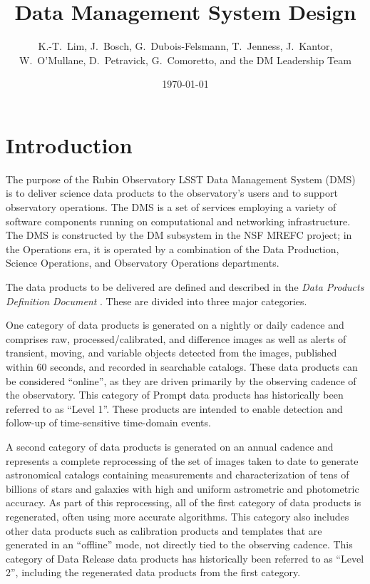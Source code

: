 \documentclass[DM,toc,lsstdraft]{lsstdoc}
\title{Data Management System Design}
\author{
  K.-T.~Lim,
  J.~Bosch,
  G.~Dubois-Felsmann,
  T.~Jenness,
  J.~Kantor,
  W.~O'Mullane,
  D.~Petravick,
  G.~Comoretto,
  and
  the DM Leadership Team}
\date{\today}
\begin{document}
\maketitle

\section{Introduction}\label{introduction}

The purpose of the Rubin Observatory LSST Data Management System (DMS) is to deliver science data
products to the observatory's users and to support observatory operations.  The
DMS is a set of services employing a variety of software components running on
computational and networking infrastructure.  The DMS is constructed by the DM
subsystem in the NSF MREFC project; in the Operations era, it is operated by a
combination of the Data Production, Science Operations, and Observatory
Operations departments.

The data products to be delivered are defined and described in the \textit{Data
Products Definition Document} . These are divided into three
major categories.

One category of data products is generated on a nightly or daily cadence
and comprises raw, processed/calibrated, and difference images as well as alerts
of transient, moving, and variable objects detected from the images,
published within 60 seconds, and recorded in searchable catalogs. These
data products can be considered ``online'', as they are driven primarily
by the observing cadence of the observatory. This category of Prompt data products has
historically been referred to as ``Level 1''.  These products are intended to
enable detection and follow-up of time-sensitive time-domain events.

A second category of data products is generated on an annual cadence and
represents a complete reprocessing of the set of images taken to date to
generate astronomical catalogs containing measurements and
characterization of tens of billions of stars and galaxies with high and
uniform astrometric and photometric accuracy. As part of this
reprocessing, all of the first category of data products is regenerated,
often using more accurate algorithms. This category also includes other
data products such as calibration products and templates that are
generated in an ``offline'' mode, not directly tied to the observing
cadence. This category of Data Release data products has historically been referred to as ``Level 2'',
including the regenerated data products from the first category.
\end{document}
